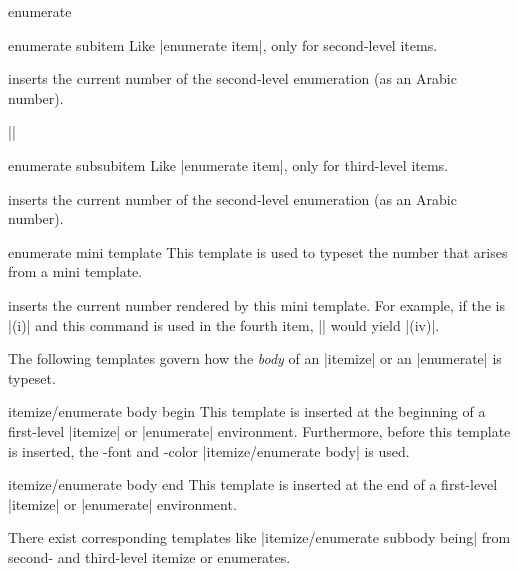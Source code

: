 \begin{environment}{{enumerate}}
  \begin{element}{enumerate subitem}\yes\yes\yes
    Like |enumerate item|, only for second-level items. 

    \begin{templateinserts}
      \iteminsert{\insertsubenumlabel}
      inserts the current number of the second-level enumeration (as an
      Arabic number). 
    \end{templateinserts}

    \example ||
  \end{element}

  \begin{element}{enumerate subsubitem}\yes\yes\yes
    Like |enumerate item|, only for third-level items. 

    \begin{templateinserts}
      \iteminsert{\insertsubsubenumlabel}
      inserts the current number of the second-level enumeration (as an
      Arabic number). 
    \end{templateinserts}
  \end{element}

  \begin{element}{enumerate mini template}\yes\yes\yes
    This template is used to typeset the number that arises from a
    mini template.

    \begin{templateinserts}
      \iteminsert{\insertenumlabel}
      inserts the current number rendered by this mini template. For
      example, if the  is |(i)| and this command
      is used in the fourth item, |\insertenumlabel| would yield
      |(iv)|.
    \end{templateinserts}
  \end{element}
\end{environment}

The following templates govern how the \emph{body} of an |itemize| or
an |enumerate| is typeset.
\begin{element}{itemize/enumerate body begin}\yes\no\no
  This template is inserted at the beginning of a first-level
  |itemize| or |enumerate| environment. Furthermore, before this
  template is inserted, the \beamer-font and -color
  |itemize/enumerate body| is used.
\end{element}
\begin{element}{itemize/enumerate body end}\yes\no\no
  This template is inserted at the end of a first-level
  |itemize| or |enumerate| environment.
\end{element}
There exist corresponding templates like
|itemize/enumerate subbody being| from second- and third-level itemize
or enumerates.

